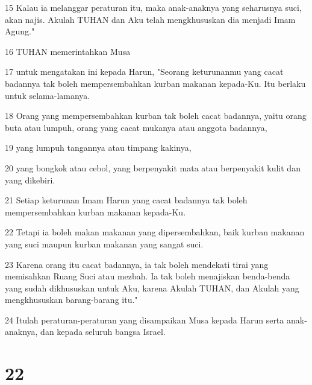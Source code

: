 \par 15 Kalau ia melanggar peraturan itu, maka anak-anaknya yang seharusnya suci, akan najis. Akulah TUHAN dan Aku telah mengkhususkan dia menjadi Imam Agung."
\par 16 TUHAN memerintahkan Musa
\par 17 untuk mengatakan ini kepada Harun, "Seorang keturunanmu yang cacat badannya tak boleh mempersembahkan kurban makanan kepada-Ku. Itu berlaku untuk selama-lamanya.
\par 18 Orang yang mempersembahkan kurban tak boleh cacat badannya, yaitu orang buta atau lumpuh, orang yang cacat mukanya atau anggota badannya,
\par 19 yang lumpuh tangannya atau timpang kakinya,
\par 20 yang bongkok atau cebol, yang berpenyakit mata atau berpenyakit kulit dan yang dikebiri.
\par 21 Setiap keturunan Imam Harun yang cacat badannya tak boleh mempersembahkan kurban makanan kepada-Ku.
\par 22 Tetapi ia boleh makan makanan yang dipersembahkan, baik kurban makanan yang suci maupun kurban makanan yang sangat suci.
\par 23 Karena orang itu cacat badannya, ia tak boleh mendekati tirai yang memisahkan Ruang Suci atau mezbah. Ia tak boleh menajiskan benda-benda yang sudah dikhususkan untuk Aku, karena Akulah TUHAN, dan Akulah yang mengkhususkan barang-barang itu."
\par 24 Itulah peraturan-peraturan yang disampaikan Musa kepada Harun serta anak-anaknya, dan kepada seluruh bangsa Israel.

\chapter{22}

